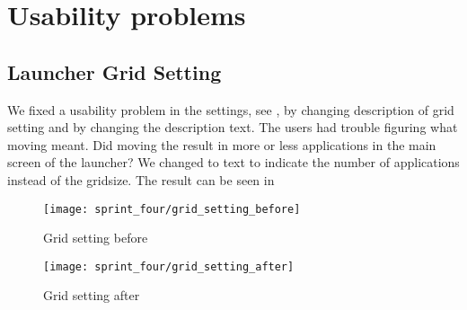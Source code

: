 
\section{Usability problems}
\label{sec:usability_problems}

\subsection{Launcher Grid Setting}
We fixed a usability problem in the \launcher settings, see , by changing description of grid setting and by changing the description text. The users had trouble figuring what moving  meant. Did moving the  result in more or less applications in the main screen of the launcher? We changed to text to indicate the number of applications instead of the gridsize. The result can be seen in   

\begin{figure}[!htbp]
        \centering
        \texttt{[image: sprint\_four/grid\_setting\_before]}
        \caption{Grid setting before}
        \label{fig:bug_splash_screen_example}
\end{figure}

\begin{figure}[!htbp]
        \centering
        \texttt{[image: sprint\_four/grid\_setting\_after]}
        \caption{Grid setting after}
        \label{fig:bug_splash_screen_example}
\end{figure} 